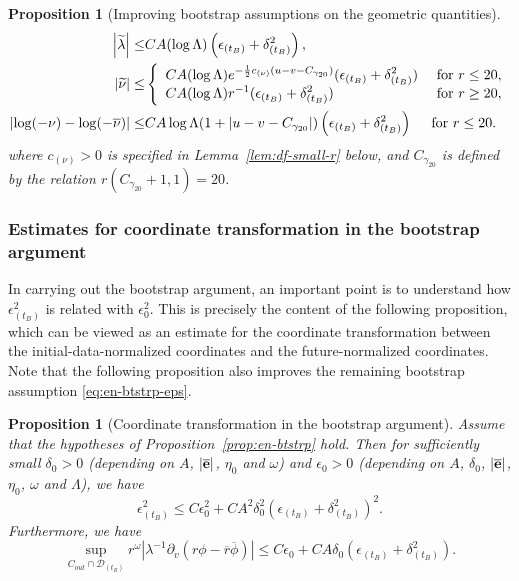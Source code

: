 \documentclass[10pt, reqno]{amsart}
\newtheorem{proposition}[theorem]{Proposition}
\theoremstyle{definition}
\theoremstyle{remark}
\theoremstyle{conjecture}
\numberwithin{equation}{section}
\newcommand{\abs}[1]{\vert#1\vert}
\newcommand{\rd}{\partial}
\newcommand{\0}{\emptyset}
\newcommand{\gmm}{\gamma}
\newcommand{\dlt}{\delta}
\newcommand{\eps}{\epsilon}
\newcommand{\lmb}{\lambda}
\newcommand{\Lmb}{\Lambda}
\newcommand{\omg}{\omega}
\newcommand{\bfe}{{\bf e}}
\newcommand{\calD}{\mathcal D}
\newcommand{\dur}{\nu}
\newcommand{\dvr}{\lmb}
\newcommand{\e}{\bfe}							%
\newcommand{\phibg}{\overline{\phi}}				%
\newcommand{\dvrbg}{\overline{\dvr}}				%
\newcommand{\durbg}{\overline{\dur}}				%
\newcommand{\rbg}{\overline{r}}					%
\newcommand{\ebg}{\overline{\e}}					%
\newcommand{\dvrdf}{\widetilde{\dvr}}				%
\newcommand{\durdf}{\widetilde{\dur}}				%
\newcommand{\Abs}[1]{\left\vert #1 \right\vert}
\begin{document}
\begin{proposition} [Improving bootstrap assumptions on the geometric quantities]
\begin{align}
	\Abs{\dvrdf} \leq & C A (\log \Lmb) \left( \eps_{(t_{B})} + \dlt_{(t_{B})}^{2} \right), \label{eq:en-btstrp:dvrdf} \\
	\Abs{\durdf} \leq & \left\{
	\begin{array}{ll}
	\displaystyle{C A (\log \Lmb) e^{- \frac{1}{2} c_{(\dur)}(u - v - C_{\gmm_{20}})}} (\eps_{(t_{B})} + \dlt_{(t_{B})}^{2})  & \hbox{ for } r \leq 20, \\
	\displaystyle{C A (\log \Lmb) r^{-1} (\eps_{(t_{B})} + \dlt_{(t_{B})}^{2})}  & \hbox{ for } r \geq 20, 
	\end{array} \right.	\label{eq:en-btstrp:durdf} \\
	\Abs{\log (-\dur) - \log (-\durbg)} 
\leq & 	C A \log \Lmb (1+\abs{u - v - C_{\gmm_{20}}}) \left( \eps_{(t_{B})} + \dlt_{(t_{B})}^{2}\right) \quad \hbox{ for } r \leq 20.	\label{eq:en-btstrp:logdurdf} 
\end{align}
where $c_{(\dur)} > 0$ is specified in Lemma~\ref{lem:df-small-r} below, and $C_{\gmm_{20}}$ is defined by the relation $r(C_{\gmm_{20}} +1, 1) = 20$.
\end{proposition}

\subsubsection*{Estimates for coordinate transformation in the bootstrap argument}
In carrying out the bootstrap argument, an important point is to understand how $\eps^{2}_{(t_{B})}$ is related with $\eps_{0}^{2}$. This is precisely the content of the following proposition, which can be viewed as an estimate for the coordinate transformation between the initial-data-normalized coordinates and the future-normalized coordinates. Note that the following proposition also improves the remaining bootstrap assumption \eqref{eq:en-btstrp-eps}.
\begin{proposition} [Coordinate transformation in the bootstrap argument] \label{prop:g-btstrp}
Assume that the hypotheses of Proposition~\ref{prop:en-btstrp} hold. Then for sufficiently small $\dlt_{0} > 0$ (depending on $A$, $\abs{\ebg}$, $\eta_0$ and $\omg$) and $\eps_{0} > 0$ (depending on $A$, $\dlt_0$, $|\ebg|$, $\eta_0$, $\omg$ and $\Lmb$), we have
\begin{equation} \label{eq:g-btstrp}
	\eps_{(t_{B})}^{2} \leq C \eps_{0}^{2} + C A^{2} \dlt_{0}^{2} \left(\eps_{(t_{B})} + \dlt_{(t_{B})}^{2} \right)^{2}.
\end{equation}
Furthermore, we have
\begin{equation} \label{eq:g-btstrp-dvrphi}
	\sup_{C_{out} \cap \calD_{(t_{B})}} r^{\omg} \Abs{\dvr^{-1} \rd_{v} (r \phi - \rbg \phibg)} \leq C \eps_{0} + C A \dlt_{0} (\eps_{(t_{B})} + \dlt_{(t_{B})}^{2}).
\end{equation}
\end{proposition}
\end{document}
